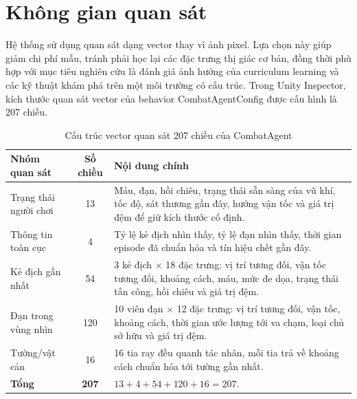 \section{Không gian quan sát}

Hệ thống sử dụng quan sát dạng vector thay vì ảnh pixel. Lựa chọn này giúp giảm chi phí mẫu, tránh phải học lại các đặc trưng thị giác cơ bản, đồng thời phù hợp với mục tiêu nghiên cứu là đánh giá ảnh hưởng của curriculum learning và các kỹ thuật khám phá trên một môi trường có cấu trúc. Trong Unity Inspector, kích thước quan sát vector của behavior CombatAgentConfig được cấu hình là 207 chiều.

\begin{table}[H]
    \centering
    \small
    \caption{Cấu trúc vector quan sát 207 chiều của CombatAgent}
    \label{tab:obs_207}
    \begin{tabular}{|p{4cm}|c|p{8cm}|}
        \hline
        \textbf{Nhóm quan sát} & \textbf{Số chiều} & \textbf{Nội dung chính} \\
        \hline
        Trạng thái người chơi & 13 & Máu, đạn, hồi chiêu, trạng thái sẵn sàng của vũ khí, tốc độ, sát thương gần đây, hướng vận tốc và giá trị đệm để giữ kích thước cố định. \\
        \hline
        Thông tin toàn cục & 4 & Tỷ lệ kẻ địch nhìn thấy, tỷ lệ đạn nhìn thấy, thời gian episode đã chuẩn hóa và tín hiệu chết gần đây. \\
        \hline
        Kẻ địch gần nhất & 54 & 3 kẻ địch $\times$ 18 đặc trưng: vị trí tương đối, vận tốc tương đối, khoảng cách, máu, mức đe dọa, trạng thái tấn công, hồi chiêu và giá trị đệm. \\
        \hline
        Đạn trong vùng nhìn & 120 & 10 viên đạn $\times$ 12 đặc trưng: vị trí tương đối, vận tốc, khoảng cách, thời gian ước lượng tới va chạm, loại chủ sở hữu và giá trị đệm. \\
        \hline
        Tường/vật cản & 16 & 16 tia ray đều quanh tác nhân, mỗi tia trả về khoảng cách chuẩn hóa tới tường gần nhất. \\
        \hline
        \textbf{Tổng} & \textbf{207} & $13 + 4 + 54 + 120 + 16 = 207$. \\
        \hline
    \end{tabular}
\end{table}

